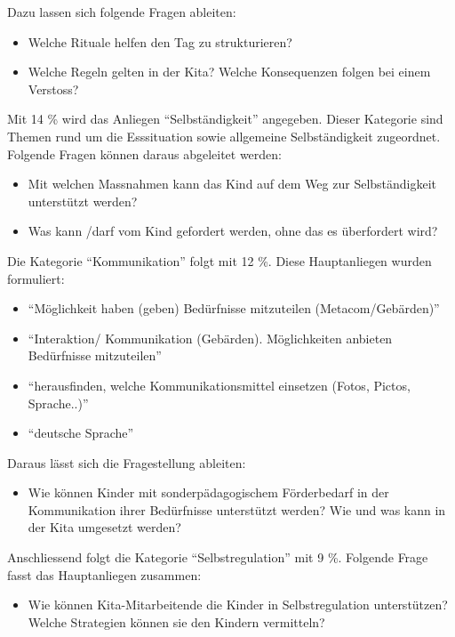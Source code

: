 \documentclass[
  ngerman,
  11pt,
  paper=a4,
  twoside,
  titlepage=true,
  openright,
  abstract=on,
  toc=listofnumbered,
  numbers=noenddot,
  chapterprefix=true,
  headings=optiontohead,
  svgnames,
  dvipsnames]{scrreprt}
\providecommand{\tightlist}{%
  \setlength{\itemsep}{0pt}\setlength{\parskip}{0pt}}
\begin{document}
Dazu lassen sich folgende Fragen ableiten:

\begin{itemize}
\tightlist
\item
  Welche Rituale helfen den Tag zu strukturieren?
\item
  Welche Regeln gelten in der Kita? Welche Konsequenzen folgen bei einem
  Verstoss?
\end{itemize}

Mit 14 \% wird das Anliegen “Selbständigkeit” angegeben. Dieser
Kategorie sind Themen rund um die Esssituation sowie allgemeine
Selbständigkeit zugeordnet. Folgende Fragen können daraus abgeleitet
werden:

\begin{itemize}
\tightlist
\item
  Mit welchen Massnahmen kann das Kind auf dem Weg zur Selbständigkeit
  unterstützt werden?
\item
  Was kann /darf vom Kind gefordert werden, ohne das es überfordert
  wird?
\end{itemize}

Die Kategorie “Kommunikation” folgt mit 12 \%. Diese Hauptanliegen
wurden formuliert:

\begin{itemize}
\tightlist
\item
  “Möglichkeit haben (geben) Bedürfnisse mitzuteilen (Metacom/Gebärden)”
\item
  “Interaktion/ Kommunikation (Gebärden). Möglichkeiten anbieten
  Bedürfnisse mitzuteilen”
\item
  “herausfinden, welche Kommunikationsmittel einsetzen (Fotos, Pictos,
  Sprache..)”
\item
  “deutsche Sprache”
\end{itemize}

Daraus lässt sich die Fragestellung ableiten:

\begin{itemize}
\tightlist
\item
  Wie können Kinder mit sonderpädagogischem Förderbedarf in der
  Kommunikation ihrer Bedürfnisse unterstützt werden? Wie und was kann
  in der Kita umgesetzt werden?
\end{itemize}

Anschliessend folgt die Kategorie “Selbstregulation” mit 9 \%. Folgende
Frage fasst das Hauptanliegen zusammen:

\begin{itemize}
\tightlist
\item
  Wie können Kita-Mitarbeitende die Kinder in Selbstregulation
  unterstützen? Welche Strategien können sie den Kindern vermitteln?
\end{itemize}
\end{document}
